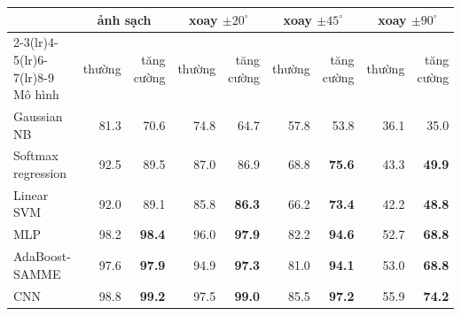 \begin{tabular}{lrrrrrrrr}
\toprule
& \multicolumn{2}{c}{ảnh sạch} & \multicolumn{2}{c}{xoay $\pm20^\circ$} & \multicolumn{2}{c}{xoay $\pm45^\circ$} & \multicolumn{2}{c}{xoay $\pm90^\circ$} \\
\cmidrule(lr){2-3}\cmidrule(lr){4-5}\cmidrule(lr){6-7}\cmidrule(lr){8-9}
Mô hình & thường & tăng cường & thường & tăng cường & thường & tăng cường & thường & tăng cường \\
\midrule
Gaussian NB & 81.3 & 70.6 & 74.8 & 64.7 & 57.8 & 53.8 & 36.1 & 35.0 \\
Softmax regression & 92.5 & 89.5 & 87.0 & 86.9 & 68.8 & \textbf{75.6} & 43.3 & \textbf{49.9} \\
Linear SVM & 92.0 & 89.1 & 85.8 & \textbf{86.3} & 66.2 & \textbf{73.4} & 42.2 & \textbf{48.8} \\
MLP & 98.2 & \textbf{98.4} & 96.0 & \textbf{97.9} & 82.2 & \textbf{94.6} & 52.7 & \textbf{68.8} \\
AdaBoost-SAMME & 97.6 & \textbf{97.9} & 94.9 & \textbf{97.3} & 81.0 & \textbf{94.1} & 53.0 & \textbf{68.8} \\
CNN & 98.8 & \textbf{99.2} & 97.5 & \textbf{99.0} & 85.5 & \textbf{97.2} & 55.9 & \textbf{74.2} \\
\bottomrule
\end{tabular}
